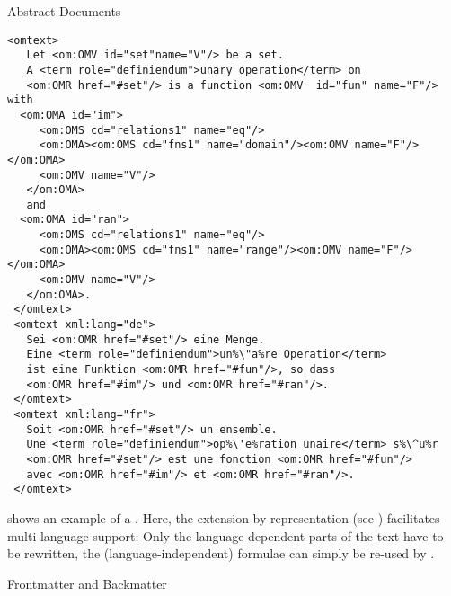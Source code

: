 \begin{omgroup}[id=omdoc-infrastructure,short=Document Infrastructure]
\begin{module}[id=docalt]
\begin{omgroup}{Abstract Documents}
\begin{example}
\begin{lstlisting}[escapechar=\%,label=lst:multiling,mathescape,
  caption={A Multilingual Group of \element{CMP} Elements},
  index={trl,xml:lang}]
 <omtext>
   Let <om:OMV id="set"name="V"/> be a set. 
   A <term role="definiendum">unary operation</term> on 
   <om:OMR href="#set"/> is a function <om:OMV  id="fun" name="F"/> with
  <om:OMA id="im">
     <om:OMS cd="relations1" name="eq"/>
     <om:OMA><om:OMS cd="fns1" name="domain"/><om:OMV name="F"/></om:OMA>
     <om:OMV name="V"/>
   </om:OMA>
   and 
  <om:OMA id="ran">
     <om:OMS cd="relations1" name="eq"/>
     <om:OMA><om:OMS cd="fns1" name="range"/><om:OMV name="F"/></om:OMA>
     <om:OMV name="V"/>
   </om:OMA>.
 </omtext>
 <omtext xml:lang="de">
   Sei <om:OMR href="#set"/> eine Menge. 
   Eine <term role="definiendum">un%\"a%re Operation</term> 
   ist eine Funktion <om:OMR href="#fun"/>, so dass
   <om:OMR href="#im"/> und <om:OMR href="#ran"/>.
 </omtext>
 <omtext xml:lang="fr">
   Soit <om:OMR href="#set"/> un ensemble. 
   Une <term role="definiendum">op%\'e%ration unaire</term> s%\^u%r
   <om:OMR href="#set"/> est une fonction <om:OMR href="#fun"/> 
   avec <om:OMR href="#im"/> et <om:OMR href="#ran"/>.
 </omtext>
\end{lstlisting}

  {} shows an example of a {}. Here, the
  {\openmath} extension by {} representation (see )
  facilitates multi-language support: Only the language-dependent parts of the text have
  to be rewritten, the (language-independent) formulae can simply be re-used by
  .
\end{example}
\end{omgroup}
\begin{omgroup}[id=docmatter]{Frontmatter and Backmatter}
\end{omgroup}
\end{module}
\end{omgroup}

